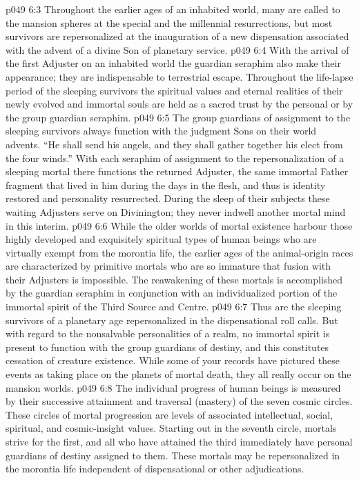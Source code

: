 \vs p049 6:3 Throughout the earlier ages of an inhabited world, many are called to the mansion spheres at the special and the millennial resurrections, but most survivors are repersonalized at the inauguration of a new dispensation associated with the advent of a divine Son of planetary service.
\vs p049 6:4 \bibnobreakspace {} With the arrival of the first Adjuster on an inhabited world the guardian seraphim also make their appearance; they are indispensable to terrestrial escape. Throughout the life\hyp{}lapse period of the sleeping survivors the spiritual values and eternal realities of their newly evolved and immortal souls are held as a sacred trust by the personal or by the group guardian seraphim.
\vs p049 6:5 The group guardians of assignment to the sleeping survivors always function with the judgment Sons on their world advents. “He shall send his angels, and they shall gather together his elect from the four winds.” With each seraphim of assignment to the repersonalization of a sleeping mortal there functions the returned Adjuster, the same immortal Father fragment that lived in him during the days in the flesh, and thus is identity restored and personality resurrected. During the sleep of their subjects these waiting Adjusters serve on Divinington; they never indwell another mortal mind in this interim.
\vs p049 6:6 While the older worlds of mortal existence harbour those highly developed and exquisitely spiritual types of human beings who are virtually exempt from the morontia life, the earlier ages of the animal\hyp{}origin races are characterized by primitive mortals who are so immature that fusion with their Adjusters is impossible. The reawakening of these mortals is accomplished by the guardian seraphim in conjunction with an individualized portion of the immortal spirit of the Third Source and Centre.
\vs p049 6:7 Thus are the sleeping survivors of a planetary age repersonalized in the dispensational roll calls. But with regard to the nonsalvable personalities of a realm, no immortal spirit is present to function with the group guardians of destiny, and this constitutes cessation of creature existence. While some of your records have pictured these events as taking place on the planets of mortal death, they all really occur on the mansion worlds.
\vs p049 6:8 \bibnobreakspace {} The individual progress of human beings is measured by their successive attainment and traversal (mastery) of the seven cosmic circles. These circles of mortal progression are levels of associated intellectual, social, spiritual, and cosmic\hyp{}insight values. Starting out in the seventh circle, mortals strive for the first, and all who have attained the third immediately have personal guardians of destiny assigned to them. These mortals may be repersonalized in the morontia life independent of dispensational or other adjudications.
